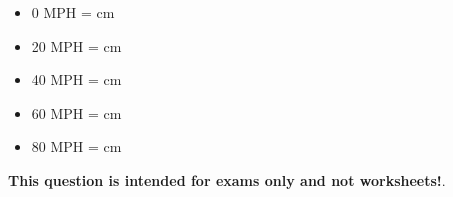 





\begin{itemize}
\item{} 0 MPH =  cm
\vskip 10pt
\item{} 20 MPH =  cm
\vskip 10pt
\item{} 40 MPH =  cm
\vskip 10pt
\item{} 60 MPH =  cm
\vskip 10pt
\item{} 80 MPH =  cm
\end{itemize}







{\bf This question is intended for exams only and not worksheets!}.


